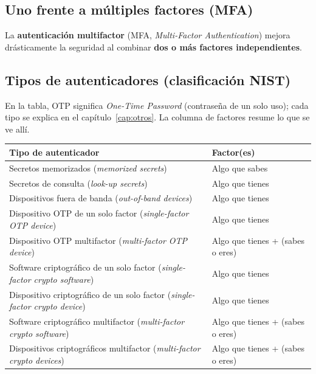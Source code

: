 \documentclass[11pt,a4paper]{report}
\begin{document}
\subsection{Uno frente a múltiples factores (MFA)}
 
\begin{importante}
La \textbf{autenticación multifactor} (MFA, \emph{Multi-Factor Authentication}) mejora drásticamente la seguridad al combinar \textbf{dos o más factores independientes}.
\end{importante}
 
\subsection{Tipos de autenticadores (clasificación NIST)}
 
En la tabla, OTP significa \emph{One-Time Password} (contraseña de un solo uso); cada tipo se explica en el capítulo~\ref{cap:otros}. La columna de factores resume lo que se ve allí.
 
\begin{center}
\small
{\setlength{\aboverulesep}{0pt}\setlength{\belowrulesep}{0pt}\renewcommand{\arraystretch}{1.25}%
\begin{tabularx}{\linewidth}{>{\raggedright\arraybackslash}X !{\color{gray!45}\vrule width 0.2pt} >{\raggedright\arraybackslash}X}
\toprule
\textbf{Tipo de autenticador} & \textbf{Factor(es)} \\
\midrule
Secretos memorizados (\emph{memorized secrets}) & Algo que sabes \\
Secretos de consulta (\emph{look-up secrets}) & Algo que tienes \\
Dispositivos fuera de banda (\emph{out-of-band devices}) & Algo que tienes \\
Dispositivo OTP de un solo factor (\emph{single-factor OTP device}) & Algo que tienes \\
Dispositivo OTP multifactor (\emph{multi-factor OTP device}) & Algo que tienes + (sabes o eres) \\
Software criptográfico de un solo factor (\emph{single-factor crypto software}) & Algo que tienes \\
Dispositivo criptográfico de un solo factor (\emph{single-factor crypto device}) & Algo que tienes \\
Software criptográfico multifactor (\emph{multi-factor crypto software}) & Algo que tienes + (sabes o eres) \\
Dispositivos criptográficos multifactor (\emph{multi-factor crypto devices}) & Algo que tienes + (sabes o eres) \\
\bottomrule
\end{tabularx}}
\end{center}
 
\end{document}
